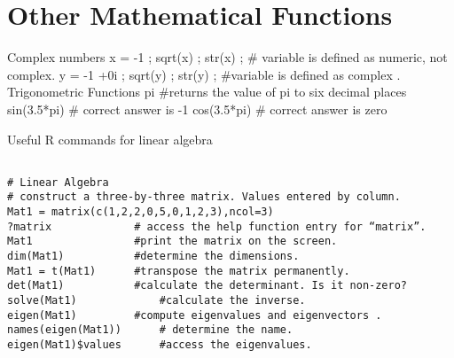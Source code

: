 \section{Other Mathematical Functions}
Complex numbers
x = -1 ;  sqrt(x)  ;  str(x) ; 	# variable is defined as numeric, not complex.
y = -1 +0i ;  sqrt(y)  ;  str(y) ;    	#variable is defined as complex .
Trigonometric  Functions
pi				#returns the value of pi to six decimal places
sin(3.5*pi)			# correct answer is -1
cos(3.5*pi)			# correct answer is zero

Useful R commands for linear algebra
\begin{verbatim}

# Linear Algebra
# construct a three-by-three matrix. Values entered by column.
Mat1 = matrix(c(1,2,2,0,5,0,1,2,3),ncol=3)
?matrix				# access the help function entry for “matrix”.
Mat1				#print the matrix on the screen.
dim(Mat1)			#determine the dimensions.
Mat1 = t(Mat1) 		#transpose the matrix permanently.
det(Mat1)			#calculate the determinant. Is it non-zero?
solve(Mat1) 			#calculate the inverse.
eigen(Mat1)			#compute eigenvalues and eigenvectors .
names(eigen(Mat1))		# determine the name.
eigen(Mat1)$values 		#access the eigenvalues.
\end{verbatim}



 
